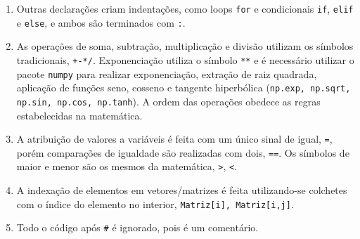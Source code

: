 \begin{apendicesenv}
\begin{enumerate}
	\item  Outras declarações criam indentações, como loops \texttt{for} e condicionais \texttt{if}, \texttt{elif} e \texttt{else}, e ambos são terminados com \texttt{:}.
	
	\item 	As operações de soma, subtração, multiplicação e divisão utilizam os símbolos tradicionais, \texttt{+-*/}. Exponenciação utiliza o símbolo \texttt{**} e é necessário utilizar o pacote \texttt{numpy} para realizar exponenciação, extração de raiz quadrada, aplicação de funções seno, cosseno e tangente hiperbólica (\texttt{np.exp, np.sqrt, np.sin, np.cos, np.tanh}). A ordem das operações obedece as regras estabelecidas na matemática. 
	
	\item 	A atribuição de valores a variáveis é feita com um único sinal de igual, \texttt{=}, porém comparações de igualdade são realizadas com dois, \texttt{==}. Os símbolos de maior e menor são os mesmos da matemática, \texttt{>}, \texttt{<}.
	
	\item 	A indexação de elementos em vetores/matrizes é feita utilizando-se colchetes com o índice do elemento no interior, \texttt{Matriz[i], Matriz[i,j]}.
	
	\item Todo o código após \texttt{#} é ignorado, pois é um comentário.
	
\end{enumerate}

\end{apendicesenv}

%
%
%
%
%
%
%
